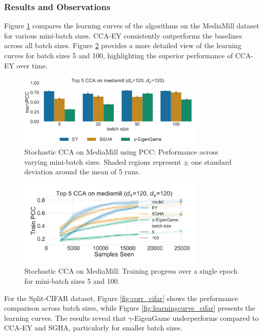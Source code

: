 \subsubsection{Results and Observations}
Figure \ref{fig:corr_mediamill} compares the learning curves of the algorithms on the MediaMill dataset for various mini-batch sizes. CCA-EY consistently outperforms the baselines across all batch sizes. Figure \ref{fig:learningcurve_mediamill} provides a more detailed view of the learning curves for batch sizes 5 and 100, highlighting the superior performance of CCA-EY over time.
\begin{figure}
\centering
\includegraphics[width=0.8\textwidth]{figures/CCA/mediamill_models_different_batch_sizes}
\caption{Stochastic CCA on MediaMill using PCC: Performance across varying mini-batch sizes. Shaded regions represent $\pm$ one standard deviation around the mean of 5 runs.}
\label{fig:corr_mediamill}
\end{figure}
\begin{figure}
\centering
\includegraphics[width=0.8\textwidth]{figures/CCA/mediamill_allbatchsizes_pcc}
\caption{Stochastic CCA on MediaMill: Training progress over a single epoch for mini-batch sizes 5 and 100.}
\label{fig:learningcurve_mediamill}
\end{figure}
For the Split-CIFAR dataset, Figure \ref{fig:corr_cifar} shows the performance comparison across batch sizes, while Figure \ref{fig:learningcurve_cifar} presents the learning curves. The results reveal that $\gamma$-EigenGame underperforms compared to CCA-EY and SGHA, particularly for smaller batch sizes.
